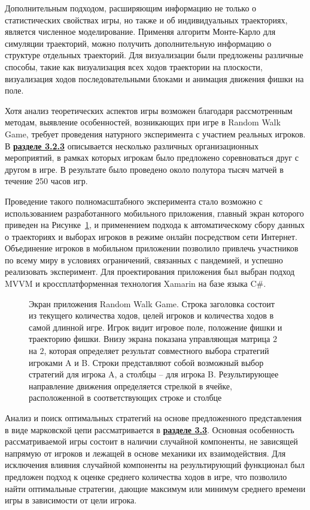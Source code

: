 Дополнительным подходом, расширяющим информацию не только о статистических свойствах игры, но также и об индивидуальных траекториях, является численное моделирование. Применяя алгоритм Монте-Карло для симуляции траекторий, можно получить дополнительную информацию о структуре отдельных траекторий. Для визуализации были предложены различные способы, такие как визуализация всех ходов траектории на плоскости, визуализация ходов последовательными блоками и анимация движения фишки на поле. 

Хотя анализ теоретических аспектов игры возможен благодаря рассмотренным методам, выявление особенностей, возникающих при игре в Random Walk Game, требует проведения натурного эксперимента с участием реальных игроков. В \underline{\textbf{разделе 3.2.3}} описывается несколько различных организационных мероприятий, в рамках которых игрокам было предложено соревноваться друг с другом в игре. В результате было проведено около полутора тысяч матчей в течение 250 часов игр.

Проведение такого полномасштабного эксперимента стало возможно с использованием разработанного мобильного приложения, главный экран которого приведен на Рисунке~\cref{fig:screenshot_game_field_ref}, и применением подхода к автоматическому сбору данных о траекториях и выборах игроков в режиме онлайн посредством сети Интернет. Объединение игроков в мобильном приложении позволило привлечь участников по всему миру в условиях ограничений, связанных с пандемией, и успешно реализовать эксперимент. Для проектирования приложения был выбран подход MVVM и кроссплатформенная технология Xamarin на базе языка C$\mathsf{\#}$.

\begin{figure}[ht]
    \caption{
        Экран приложения Random Walk Game. Строка заголовка состоит из текущего количества ходов, 
        целей игроков и количества ходов в самой длинной игре. Игрок видит игровое поле, положение фишки и траекторию фишки. Внизу экрана показана управляющая матрица $2$ на $2$, которая определяет результат совместного выбора стратегий игроками A и B. Строки представляют собой возможный выбор стратегий для игрока A, а столбцы -- для игрока B. Результирующее направление движения  определяется стрелкой в ячейке, расположенной в соответствующих строке и столбце
    }\label{fig:screenshot_game_field_ref}
\end{figure}

Анализ и поиск оптимальных стратегий на основе предложенного представления в виде марковской цепи рассматривается в \underline{\textbf{разделе 3.3}}. Основная особенность рассматриваемой игры состоит в наличии случайной компоненты, не зависящей напрямую от игроков и лежащей в основе механики их взаимодействия. Для исключения влияния случайной компоненты на результирующий функционал был предложен подход к оценке среднего количества ходов в игре, что позволило найти оптимальные стратегии, дающие максимум или минимум среднего времени игры в зависимости от цели игрока.

